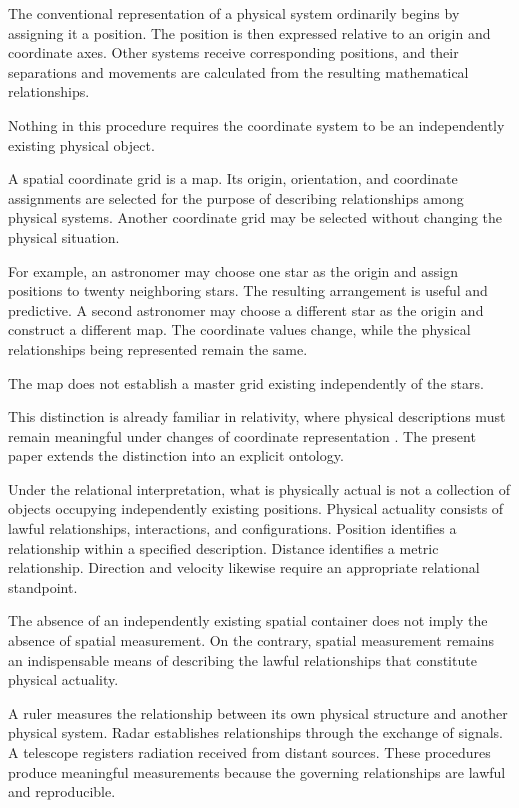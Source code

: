 \documentclass[12pt,onecolumn]{article}
\begin{document}
The conventional representation of a physical system ordinarily begins by assigning it a position. The position is then expressed relative to an origin and coordinate axes. Other systems receive corresponding positions, and their separations and movements are calculated from the resulting mathematical relationships.

Nothing in this procedure requires the coordinate system to be an independently existing physical object.

A spatial coordinate grid is a map. Its origin, orientation, and coordinate assignments are selected for the purpose of describing relationships among physical systems. Another coordinate grid may be selected without changing the physical situation.

For example, an astronomer may choose one star as the origin and assign positions to twenty neighboring stars. The resulting arrangement is useful and predictive. A second astronomer may choose a different star as the origin and construct a different map. The coordinate values change, while the physical relationships being represented remain the same.

The map does not establish a master grid existing independently of the stars.

This distinction is already familiar in relativity, where physical descriptions must remain meaningful under changes of coordinate representation \cite{Wald,Einstein1905}. The present paper extends the distinction into an explicit ontology.

Under the relational interpretation, what is physically actual is not a collection of objects occupying independently existing positions. Physical actuality consists of lawful relationships, interactions, and configurations. Position identifies a relationship within a specified description. Distance identifies a metric relationship. Direction and velocity likewise require an appropriate relational standpoint.

The absence of an independently existing spatial container does not imply the absence of spatial measurement. On the contrary, spatial measurement remains an indispensable means of describing the lawful relationships that constitute physical actuality.

A ruler measures the relationship between its own physical structure and another physical system. Radar establishes relationships through the exchange of signals. A telescope registers radiation received from distant sources. These procedures produce meaningful measurements because the governing relationships are lawful and reproducible.
\end{document}
